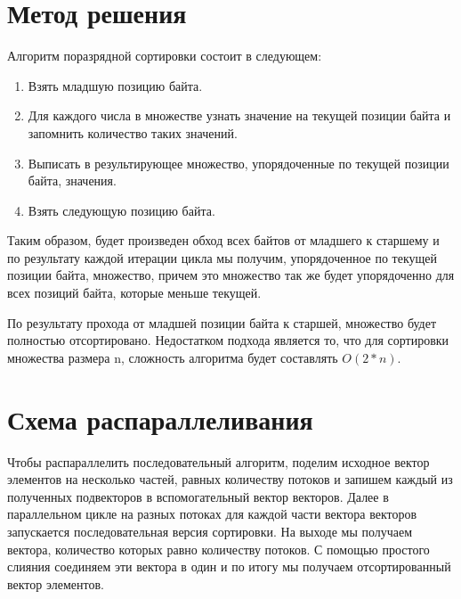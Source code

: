 \documentclass{report}
\begin{document}
\section*{Метод решения}
Алгоритм поразрядной сортировки состоит в следующем:
\begin{enumerate}
\item Взять младшую позицию байта.
\item Для каждого числа в множестве узнать значение на текущей позиции байта и запомнить количество таких значений.
\item Выписать в результирующее множество, упорядоченные по текущей позиции байта, значения.
\item Взять следующую позицию байта.
\end{enumerate}
\par Таким образом, будет произведен обход всех байтов от младшего к старшему и по результату каждой итерации цикла мы получим, упорядоченное по текущей позиции байта, множество, причем это множество так же будет упорядоченно для всех позиций байта, которые меньше текущей. 
\par По результату прохода от младшей позиции байта к старшей, множество будет полностью отсортировано.
Недостатком подхода является то, что для сортировки множества размера n, сложность алгоритма будет составлять $O(2*n)$.
\newpage

\section*{Схема распараллеливания}
Чтобы распараллелить последовательный алгоритм, поделим исходное вектор элементов на несколько частей, равных количеству потоков и запишем каждый из полученных подвекторов в вспомогательный вектор векторов. 
Далее в параллельном цикле на разных потоках для каждой части вектора векторов запускается последовательная версия сортировки. На выходе мы получаем вектора, количество которых равно количеству потоков. С помощью простого слияния соединяем эти вектора в один и по итогу мы получаем отсортированный вектор элементов.
\newpage

\end{document}
